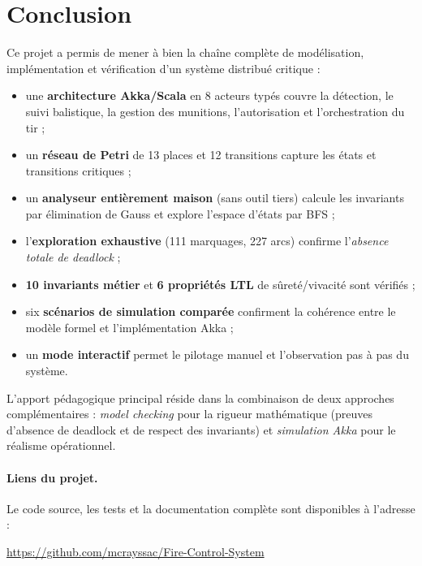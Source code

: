 \documentclass[11pt,a4paper]{article}
\begin{document}
\section{Conclusion}

Ce projet a permis de mener à bien la chaîne complète de modélisation,
implémentation et vérification d'un système distribué critique :

\begin{itemize}[leftmargin=1.2cm,itemsep=2pt]
  \item une \textbf{architecture Akka/Scala} en 8 acteurs typés couvre la
        détection, le suivi balistique, la gestion des munitions,
        l'autorisation et l'orchestration du tir ;
  \item un \textbf{réseau de Petri} de 13 places et 12 transitions
        capture les états et transitions critiques ;
  \item un \textbf{analyseur entièrement maison} (sans outil tiers) calcule
        les invariants par élimination de Gauss et explore l'espace
        d'états par BFS ;
  \item l'\textbf{exploration exhaustive} (111 marquages, 227 arcs)
        confirme l'\emph{absence totale de deadlock} ;
  \item \textbf{10 invariants métier} et \textbf{6 propriétés LTL} de
        sûreté/vivacité sont vérifiés ;
  \item six \textbf{scénarios de simulation comparée} confirment la
        cohérence entre le modèle formel et l'implémentation Akka ;
  \item un \textbf{mode interactif} permet le pilotage manuel et
        l'observation pas à pas du système.
\end{itemize}

L'apport pédagogique principal réside dans la combinaison de deux
approches complémentaires : \emph{model checking} pour la rigueur
mathématique (preuves d'absence de deadlock et de respect des invariants)
et \emph{simulation Akka} pour le réalisme opérationnel.

\paragraph{Liens du projet.}
Le code source, les tests et la documentation complète sont disponibles à
l'adresse :
\begin{center}
\url{https://github.com/mcrayssac/Fire-Control-System}
\end{center}
\end{document}
